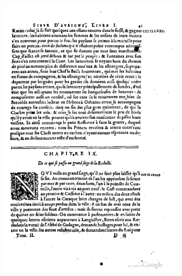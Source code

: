 \begin{figure}
\centering
    \begin{subfigure}[b]{0.4\textwidth}
    \includegraphics[width=\textwidth]{resources/500_0043}
    \end{subfigure}
    \begin{subfigure}[b]{0.4\textwidth}

\end{subfigure}
\end{figure}
